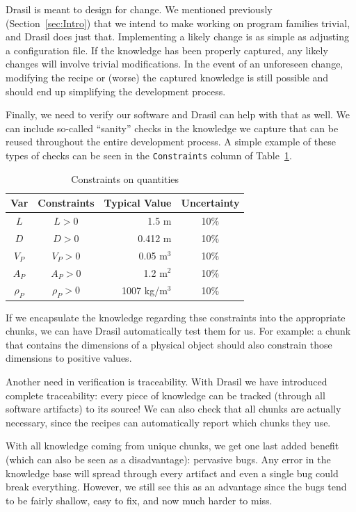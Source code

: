 \documentclass[preprint, 10pt]{sigplanconf}
\begin{document}
Drasil is meant to design for change. We mentioned previously
(Section~\ref{sec:Intro}) that we intend to make working on program families
trivial, and Drasil does just that. Implementing a likely change is as simple as
adjusting a configuration file. If the knowledge has been properly captured, any
likely changes will involve trivial modifications. In the event of an unforeseen
change, modifying the recipe or (worse) the captured knowledge is still possible
and should end up simplifying the development process.

Finally, we need to verify our software and Drasil can help with that as well.
We can include so-called ``sanity'' checks in the knowledge we capture that can
be reused throughout the entire development process. A simple example of these
types of checks can be seen in the \verb|Constraints| column of
Table~\ref{tab:constraints}.

\begin{table} 
\centering
\nocaptionrule \caption{Constraints on quantities}
\begin{tabular}{|c|c|r|c|} \hline
\textbf{Var} & \textbf{Constraints} & \textbf{Typical Value} &
\textbf{Uncertainty}\\ \hline
$L$ & $L > 0$ & 1.5 m & 10\% \\ \hline
$D$ & $D > 0$ & 0.412 m & 10\% \\ \hline
$V_P$ & $V_P > 0$ & 0.05 m$^3$	& 10\% \\ \hline
$A_P$ & $A_P > 0$ & 1.2 m$^2$	& 10\% \\ \hline
$\rho_P$ & $\rho_P > 0$	& 1007 kg/m$^3$	& 10\% \\
\hline\end{tabular}
\label{tab:constraints}
\end{table}

If we encapsulate the knowledge regarding thse constraints into the appropriate
chunks, we can have Drasil automatically test them for us. For example: a chunk
that contains the dimensions of a physical object should also constrain those
dimensions to positive values.

Another need in verification is traceability. With Drasil we have introduced
complete traceability: every piece of knowledge can be tracked (through all
software artifacts) to its source! We can also check that all chunks are
actually necessary, since the recipes can automatically report which chunks they
use.

With all knowledge coming from unique chunks, we get one last added benefit
(which can also be seen as a disadvantage): pervasive bugs. Any error in the
knowledge base will spread through every artifact and even a single bug could
break everything. However, we still see this as an advantage since the bugs tend
to be fairly shallow, easy to fix, and now much harder to miss.
\end{document}

